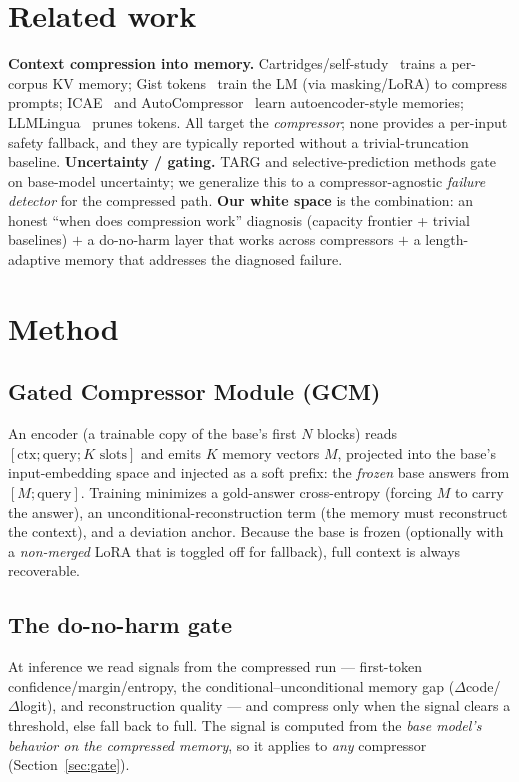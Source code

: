 \documentclass[11pt]{article}
\begin{document}
\section{Related work}
\textbf{Context compression into memory.} Cartridges/self-study~\cite{cartridges} trains a per-corpus KV
memory; Gist tokens~\cite{gist} train the LM (via masking/LoRA) to compress prompts; ICAE~\cite{icae} and
AutoCompressor~\cite{autocompressor} learn autoencoder-style memories; LLMLingua~\cite{llmlingua} prunes tokens.
All target the \emph{compressor}; none provides a per-input safety fallback, and they are typically reported
without a trivial-truncation baseline. \textbf{Uncertainty / gating.} TARG and selective-prediction methods
gate on base-model uncertainty; we generalize this to a compressor-agnostic \emph{failure detector} for the
compressed path. \textbf{Our white space} is the combination: an honest ``when does compression work''
diagnosis (capacity frontier + trivial baselines) $+$ a do-no-harm layer that works across compressors $+$ a
length-adaptive memory that addresses the diagnosed failure.

\section{Method}
\subsection{Gated Compressor Module (GCM)}
An encoder (a trainable copy of the base's first $N$ blocks) reads $[\text{ctx};\text{query};K\text{ slots}]$
and emits $K$ memory vectors $M$, projected into the base's input-embedding space and injected as a soft prefix:
the \emph{frozen} base answers from $[M;\text{query}]$. Training minimizes a gold-answer cross-entropy (forcing
$M$ to carry the answer), an unconditional-reconstruction term (the memory must reconstruct the context), and a
deviation anchor. Because the base is frozen (optionally with a \emph{non-merged} LoRA that is toggled off for
fallback), full context is always recoverable.

\subsection{The do-no-harm gate}
At inference we read signals from the compressed run --- first-token confidence/margin/entropy, the
conditional--unconditional memory gap ($\Delta$code/$\Delta$logit), and reconstruction quality --- and compress
only when the signal clears a threshold, else fall back to full. The signal is computed from the \emph{base
model's behavior on the compressed memory}, so it applies to \emph{any} compressor (Section~\ref{sec:gate}).
\end{document}
